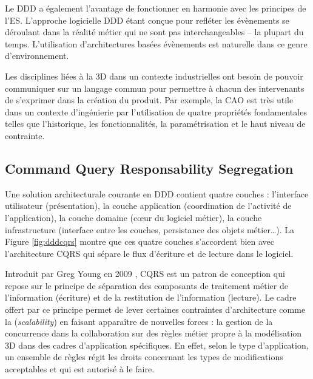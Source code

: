 Le \gls{DDD} a également l'avantage de fonctionner en harmonie avec les 
principes de l'\gls{ES}. L'approche logicielle \gls{DDD} étant conçue pour refléter 
les évènements se déroulant dans la réalité métier qui ne sont pas 
interchangeables -- la plupart du temps. L'utilisation d'architectures 
basées évènements est naturelle dans ce genre d'environnement. 

Les disciplines liées à la 3D dans un contexte industrielles ont besoin de pouvoir 
communiquer sur un langage commun pour permettre à chacun des 
intervenants de s'exprimer dans la création du produit. Par exemple, la \gls{CAO} 
est très utile dans un contexte d'ingénierie par l'utilisation de quatre propriétés 
fondamentales telles que l'historique, les fonctionnalités, la paramétrisation et le 
haut niveau de contrainte.



\subsection{Command Query Responsability Segregation}
\label{sec:CQRS}
Une solution architecturale courante en \gls{DDD} contient quatre 
couches : l'interface utilisateur (présentation), la couche application (coordination 
de l'activité de l'application), la couche domaine (c\oe ur du logiciel métier), la 
couche infrastructure (interface entre les couches, persistance des objets 
métier\dots). La Figure \ref{fig:dddcqrs} montre que ces quatre couches s'accordent
bien avec l'architecture \gls{CQRS} qui sépare le flux d'écriture et de lecture dans 
le logiciel.

Introduit par Greg Young en 2009 \cite{Young2009}, \gls{CQRS} est un patron de 
conception qui repose sur le principe de séparation des composants de traitement 
métier de l'information (écriture) et de la restitution de l'information (lecture). Le 
cadre offert par ce principe permet de lever certaines contraintes d'architecture 
comme la (\textit{scalability}) en faisant apparaître de nouvelles forces : la gestion 
de la concurrence dans la collaboration sur des règles métier propre à la 
modélisation 3D dans des cadres d'application spécifiques. En effet, selon le type 
d'application, un ensemble de règles régit les droits concernant les types de 
modifications acceptables et qui est autorisé à le faire.

